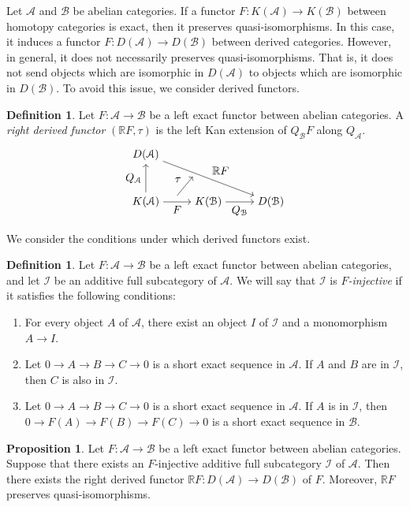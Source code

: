 \documentclass[a4paper,dvipdfmx,11pt,reqno]{amsart}
\newcommand{\bbR}{\mathbb{R}}
\newcommand{\A}{\mathcal{A}}
\newcommand{\B}{\mathcal{B}}
\newcommand{\I}{\mathcal{I}}
\theoremstyle{definition}
\newtheorem{definition}[theorem]{Definition}
\newtheorem{proposition}[theorem]{Proposition}
\begin{document}
Let $\A$ and $\B$ be abelian categories.
If a functor $F : K(\A) \to K(\B)$ between homotopy categories is exact, then it preserves quasi-isomorphisms.
In this case, it induces a functor $F : D(\A) \to D(\B)$ between derived categories.
However, in general, it does not necessarily preserves quasi-isomorphisms.
That is, it does not send objects which are isomorphic in $D(\A)$ to objects which are isomorphic in $D(\B)$.
To avoid this issue, we consider derived functors.

\begin{definition}
  Let $F : \A \to \B$ be a left exact functor between abelian categories.
  A \textit{right derived functor} $(\bbR F,\tau)$ is the left Kan extension of $Q_{\B}F$ along $Q_{\A}$.
  \[\begin{tikzpicture}[auto,->] 
    \node (tl) at (0,1.5) {$D(\A)$}; 
    \node (bl) at (0,0) {$K(\A)$}; 
    \node (bm) at (2,0) {$K(\B)$};
    \node (br) at (4,0) {$D(\B)$}; 
    \draw (bl) -- node[swap] {$F$} (bm); 
    \draw (bm) -- node[swap] {$Q_{\B}$} (br);
    \draw (bl) -- node {$Q_{\A}$} (tl);
    \draw (tl) -- node {$\bbR F$} (br); 
    \draw (1,0.2) -- node {$\tau$} (1.5,0.8);
  \end{tikzpicture}\]
\end{definition}

We consider the conditions under which derived functors exist.

\begin{definition} \label{Ike.2.1.26}
  Let $F : \A \to \B$ be a left exact functor between abelian categories, and let $\I$ be an additive full subcategory of $\A$.
  We will say that $\I$ is \textit{$F$-injective} if it satisfies the following conditions:
  \begin{enumerate}
    \item For every object $A$ of $\A$, there exist an object $I$ of $\I$ and a monomorphism $A \to I$.
    \item Let $0 \to A \to B \to C \to 0$ is a short exact sequence in $\A$. 
    If $A$ and $B$ are in $\I$, then $C$ is also in $\I$.
    \item Let $0 \to A \to B \to C \to 0$ is a short exact sequence in $\A$.
    If $A$ is in $\I$, then $0 \to F(A) \to F(B) \to F(C) \to 0$ is a short exact sequence in $\B$.
  \end{enumerate}
\end{definition}

\begin{proposition} \label{Ike.2.1.28}
  Let $F : \A \to \B$ be a left exact functor between abelian categories.
  Suppose that there exists an $F$-injective additive full subcategory $\I$ of $\A$.
  Then there exists the right derived functor $\bbR F : D(\A) \to D(\B)$ of $F$.
  Moreover, $\bbR F$ preserves quasi-isomorphisms.
\end{proposition}
\end{document}
